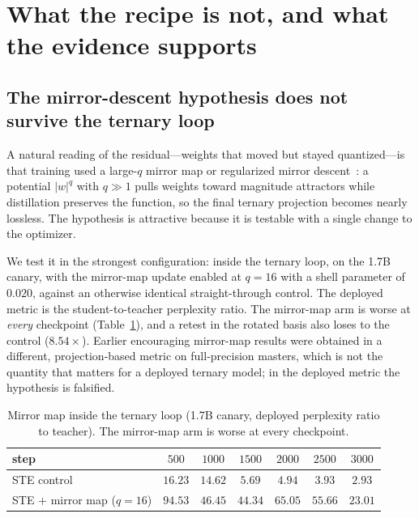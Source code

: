 \section{What the recipe is not, and what the evidence supports}
\label{sec:recipe}

\subsection{The mirror-descent hypothesis does not survive the ternary loop}
\label{sec:rmd}

A natural reading of the residual---weights that moved but stayed quantized---is
that training used a large-$q$ mirror map or regularized mirror
descent~\citep{rmd,rmd2,proximalmf}: a potential $|w|^q$ with $q \gg 1$ pulls
weights toward magnitude attractors while distillation preserves the function,
so the final ternary projection becomes nearly lossless. The hypothesis is
attractive because it is testable with a single change to the optimizer.

We test it in the strongest configuration: inside the ternary loop, on the
1.7B canary, with the mirror-map update enabled at $q{=}16$ with a shell
parameter of $0.020$, against an otherwise identical straight-through control.
The deployed metric is the student-to-teacher perplexity ratio. The mirror-map
arm is worse at \emph{every} checkpoint (Table~\ref{tab:rmd}), and a retest in
the rotated basis also loses to the control ($8.54\times$). Earlier
encouraging mirror-map results were obtained in a different, projection-based
metric on full-precision masters, which is not the quantity that matters for a
deployed ternary model; in the deployed metric the hypothesis is falsified.

\begin{table}[t]
\caption{Mirror map inside the ternary loop (1.7B canary, deployed perplexity
ratio to teacher). The mirror-map arm is worse at every checkpoint.}
\label{tab:rmd}
\begin{center}
\begin{tabular}{lcccccc}
\toprule
step & $500$ & $1000$ & $1500$ & $2000$ & $2500$ & $3000$ \\
\midrule
STE control & $16.23$ & $14.62$ & $5.69$ & $4.94$ & $3.93$ & $\mathbf{2.93}$ \\
STE $+$ mirror map ($q{=}16$) & $94.53$ & $46.45$ & $44.34$ & $65.05$ & $55.66$ & $23.01$ \\
\bottomrule
\end{tabular}
\end{center}
\end{table}

